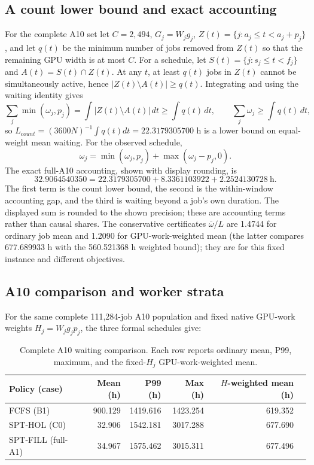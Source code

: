 \subsection{A count lower bound and exact accounting}
For the complete A10 set let $C=2,494$, $G_j=W_jg_j$, $Z(t)=\{j:a_j\le t<a_j+p_j\}$, and let $q(t)$ be the minimum number of jobs removed from $Z(t)$ so that the remaining GPU width is at most $C$. For a schedule, let $S(t)=\{j:s_j\le t<f_j\}$ and $A(t)=S(t)\cap Z(t)$. At any $t$, at least $q(t)$ jobs in $Z(t)$ cannot be simultaneously active, hence $|Z(t)\setminus A(t)|\ge q(t)$. Integrating and using the waiting identity gives
\begin{equation}
\sum_j\min(\omega_j,p_j)=\int |Z(t)\setminus A(t)|\,dt\ge\int q(t)\,dt,
\qquad \sum_j\omega_j\ge\int q(t)\,dt,
\end{equation}
so $L_{count}=(3600N)^{-1}\int q(t)dt=22.3179305700$ h is a lower bound on equal-weight mean waiting. For the observed schedule,
\begin{equation}
\omega_j=\min(\omega_j,p_j)+\max(\omega_j-p_j,0).
\end{equation}
The exact full-A10 accounting, shown with display rounding, is
\begin{equation}
32.9064540350 = 22.3179305700 + 8.3361103922 + 2.2524130728\ \mathrm{h}.
\end{equation}
The first term is the count lower bound, the second is the within-window accounting gap, and the third is waiting beyond a job's own duration. The displayed sum is rounded to the shown precision; these are accounting terms rather than causal shares. The conservative certificates $\bar\omega/L$ are 1.4744 for ordinary job mean and 1.2090 for GPU-work-weighted mean (the latter compares 677.689933 h with the 560.521368 h weighted bound); they are for this fixed instance and different objectives.

\subsection{A10 comparison and worker strata}
For the same complete 111,284-job A10 population and fixed native GPU-work weights $H_j=W_jg_jp_j$, the three formal schedules give:
\begin{table}[H]\centering
\caption{Complete A10 waiting comparison. Each row reports ordinary mean, P99, maximum, and the fixed-$H_j$ GPU-work-weighted mean.}
\label{tab:r2a10}
\begin{tabular}{lrrrrr}
\toprule
Policy (case) & Mean (h) & P99 (h) & Max (h) & $H$-weighted mean (h)\\
\midrule
FCFS (B1) &900.129&1419.616&1423.254&619.352\\
SPT-HOL (C0) &32.906&1542.181&3017.288&677.690\\
SPT-FILL (full-A1) &34.967&1575.462&3015.311&677.496\\
\bottomrule
\end{tabular}
\end{table}

